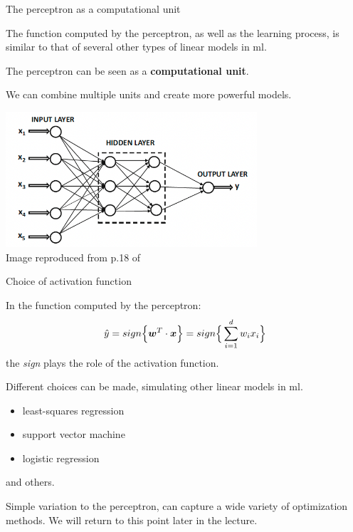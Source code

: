 %
%
%

\begin{frame}[t]{The perceptron as a computational unit}

The function computed by the \gls{perceptron},
as well as the learning process, is similar to that of several
other types of \glspl{linear model} in \gls{ml}.

The \gls{perceptron} can be seen as a {\bf computational unit}.

We can combine multiple units and create more powerful models.

\begin{center}
    \includegraphics[width=0.70\textwidth]{./images/perceptron/combining_units.png}\\
    {\scriptsize \color{col:attribution} 
    Image reproduced from p.18 of \cite{Aggarwal:2018SpringerDL}}\\
 \end{center}


\end{frame}

%
%
%

\begin{frame}[t]{Choice of activation function}

    In the function computed by the \gls{perceptron}: 
    \begin{equation}
        \hat{y} = sign\Big\{ \boldsymbol{w}^T \cdot \boldsymbol{x} \Big\} = sign\Big\{ \sum_{i=1}^{d} w_i x_i \Big\}
    \end{equation}        
    the {\em sign} plays the role of the \gls{activation function}.\\
    \vspace{0.2cm}

    Different choices can be made, 
    simulating other \glspl{linear model} in \gls{ml}.
    \begin{itemize}
        \item least-squares regression
        \item support vector machine
        \item logistic regression
    \end{itemize}
    and others.

    Simple variation to the \gls{perceptron}, can capture a wide variety of optimization methods.
    We will return to this point later in the lecture.\\

\end{frame}

